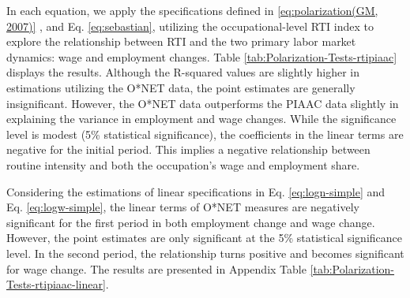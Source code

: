 \begin{onehalfspace}
In each equation, we apply the specifications defined in \ref{eq:polarization(GM, 2007)}
, and Eq. \ref{eq:sebastian}, utilizing the occupational-level RTI
index to explore the relationship between RTI and the two primary
labor market dynamics: wage and employment changes. Table \ref{tab:Polarization-Tests-rtipiaac}
displays the results. Although the R-squared values are slightly higher
in estimations utilizing the O{*}NET data, the point estimates are
generally insignificant. However, the O{*}NET data outperforms the
PIAAC data slightly in explaining the variance in employment and wage
changes. While the significance level is modest (5\% statistical significance),
the coefficients in the linear terms are negative for the initial
period. This implies a negative relationship between routine intensity
and both the occupation's wage and employment share.

Considering the estimations of linear specifications in Eq. \ref{eq:logn-simple}
and Eq. \ref{eq:logw-simple}, the linear terms of O{*}NET measures
are negatively significant for the first period in both employment
change and wage change. However, the point estimates are only significant
at the 5\% statistical significance level. In the second period, the
relationship turns positive and becomes significant for wage change.
The results are presented in Appendix Table \ref{tab:Polarization-Tests-rtipiaac-linear}.
\end{onehalfspace}
\begin{onehalfspace}
\begin{center}

\par\end{center}
\end{onehalfspace}

\vspace{-1cm}


